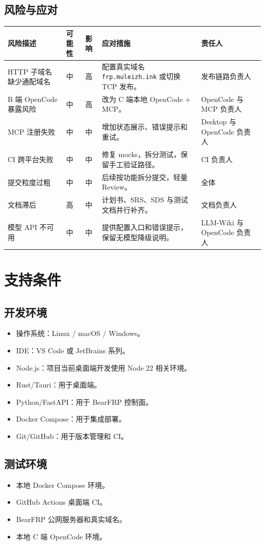 \documentclass[UTF8,a4paper,12pt,fontset=fandol]{ctexart}
\newcommand{\code}[1]{\begingroup\urlstyle{tt}\footnotesize\nolinkurl{#1}\endgroup}
\begin{document}
\subsection{风险与应对}
\begin{longtable}{p{3.6cm}>{\centering\arraybackslash}p{1.3cm}>{\centering\arraybackslash}p{1.3cm}p{4.7cm}p{3.1cm}}
\toprule
风险描述 & 可能性 & 影响 & 应对措施 & 责任人 \\
\midrule
HTTP 子域名缺少通配域名 & 中 & 高 & 配置真实域名 \code{frp.muleizh.ink} 或切换 TCP 发布。 & 发布链路负责人 \\
B 端 OpenCode 暴露风险 & 中 & 高 & 改为 C 端本地 OpenCode + MCP。 & OpenCode 与 MCP 负责人 \\
MCP 注册失败 & 中 & 中 & 增加状态展示、错误提示和重试。 & Desktop 与 OpenCode 负责人 \\
CI 跨平台失败 & 中 & 中 & 修复 mocks，拆分测试，保留手工验证路径。 & CI 负责人 \\
提交粒度过粗 & 中 & 中 & 后续按功能拆分提交，轻量 Review。 & 全体 \\
文档滞后 & 高 & 中 & 计划书、SRS、SDS 与测试文档并行补齐。 & 文档负责人 \\
模型 API 不可用 & 中 & 中 & 提供配置入口和错误提示，保留无模型降级说明。 & LLM-Wiki 与 OpenCode 负责人 \\
\bottomrule
\end{longtable}

\section{支持条件}

\subsection{开发环境}
\begin{itemize}
  \item 操作系统：Linux / macOS / Windows。
  \item IDE：VS Code 或 JetBrains 系列。
  \item Node.js：项目当前桌面端开发使用 Node 22 相关环境。
  \item Rust/Tauri：用于桌面端。
  \item Python/FastAPI：用于 BearFRP 控制面。
  \item Docker Compose：用于集成部署。
  \item Git/GitHub：用于版本管理和 CI。
\end{itemize}

\subsection{测试环境}
\begin{itemize}
  \item 本地 Docker Compose 环境。
  \item GitHub Actions 桌面端 CI。
  \item BearFRP 公网服务器和真实域名。
  \item 本地 C 端 OpenCode 环境。
\end{itemize}
\end{document}
